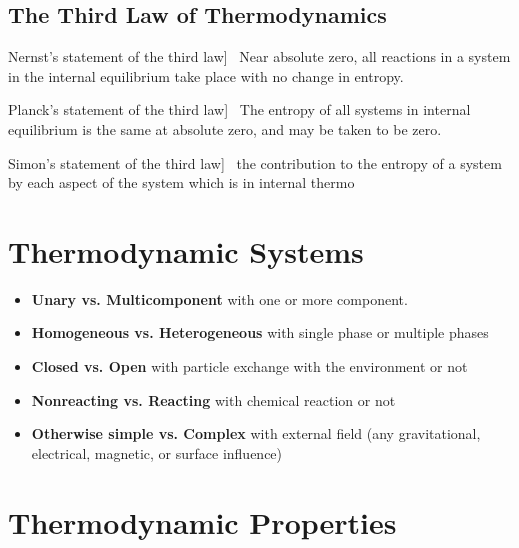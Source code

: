 \documentclass[UTF8]{book}
\newenvironment{theorem}[2][Theorem]{\begin{trivlist}
\item[\hskip \labelsep {\bfseries #1}\hskip \labelsep {\bfseries }]}{\end{trivlist}}
\begin{document}
\subsection{The Third Law of Thermodynamics}
\begin{theorem}
[Nernst's statement of the third law]~  {Near absolute zero, all reactions in a system in the internal equilibrium take place with no change in entropy.}
\end{theorem}

\begin{theorem}
[Planck's statement of the third law]~  {The entropy of all systems in internal equilibrium is the same at absolute zero, and may be taken to be zero.}
\end{theorem}

\begin{theorem}
[Simon's statement of the third law]~  {the contribution to the entropy of a system by each aspect of the system which is in internal thermo}
\end{theorem}

\section{Thermodynamic Systems}
\begin{itemize}
\item{ {\textbf{Unary vs. Multicomponent}}}
 { with one or more component.}
\item{ {\textbf{Homogeneous vs. Heterogeneous}}}
 { with single phase or multiple phases}
\item{ {\textbf{Closed vs. Open}}}
 { with particle exchange with the environment or not}
\item{ {\textbf{Nonreacting vs. Reacting}}}
 { with chemical reaction or not}
\item{ {\textbf{Otherwise simple vs. Complex}}}
 { with external field (any gravitational, electrical, magnetic, or surface influence)}
\end{itemize}

\section{Thermodynamic Properties}
\end{document}

